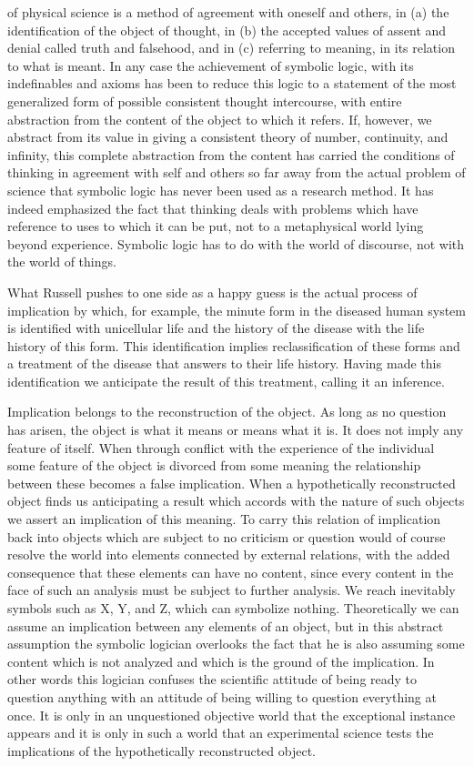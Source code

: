 \documentclass[12pt]{article}
\begin{document}
of physical science is a method of agreement with oneself
and others, in (a) the identification of the object
of thought, in (b) the accepted values of assent and
denial called truth and falsehood, and in (c) referring
to meaning, in its relation to what is meant. In any
case the achievement of symbolic logic, with its indefinables
and axioms has been to reduce this logic to
a statement of the most generalized form of possible
consistent thought intercourse, with entire abstraction
from the content of the object to which it refers.
If, however, we abstract from its value in giving
a consistent theory of number, continuity, and infinity,
this complete abstraction from the content has
carried the conditions of thinking in agreement with
self and others so far away from the actual problem
of science that symbolic logic has never been used as
a research method. It has indeed emphasized the fact
that thinking deals with problems which have reference
to uses to which it can be put, not to a metaphysical
world lying beyond experience. Symbolic logic has to
do with the world of discourse, not with the world of
things.


What Russell pushes to one side as a happy guess
is the actual process of implication by which, for example,
the minute form in the diseased human system is
identified with unicellular life and the history of the
disease with the life history of this form. This identification
implies reclassification of these forms and a
treatment of the disease that answers to their life history.
Having made this identification we anticipate the
result of this treatment, calling it an inference.


Implication belongs to the reconstruction of the object.
As long as no question has arisen, the object
is what it means or means what it is. It does not
imply any feature of itself. When through conflict
with the experience of the individual some feature of
the object is divorced from some meaning the relationship
between these becomes a false implication. When
a hypothetically reconstructed object finds us anticipating
a result which accords with the nature of such
objects we assert an implication of this meaning. To
carry this relation of implication back into objects
which are subject to no criticism or question would of
course resolve the world into elements connected by
external relations, with the added consequence that
these elements can have no content, since every content
in the face of such an analysis must be subject
to further analysis. We reach inevitably symbols such
as X, Y, and Z, which can symbolize nothing. Theoretically
we can assume an implication between any
elements of an object, but in this abstract assumption
the symbolic logician overlooks the fact that he is also
assuming some content which is not analyzed and which
is the ground of the implication. In other words this
logician confuses the scientific attitude of being ready
to question anything with an attitude of being willing
to question everything at once. It is only in an unquestioned
objective world that the exceptional instance
appears and it is only in such a world that an
experimental science tests the implications of the hypothetically
reconstructed object.
\end{document}
